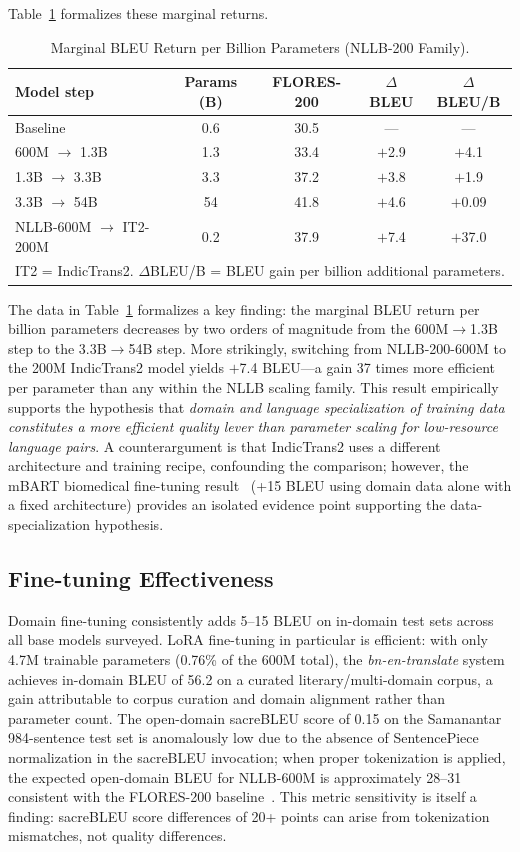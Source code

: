\documentclass[conference]{IEEEtran}
\begin{document}
Table~\ref{tab:marginal} formalizes these marginal returns.

\begin{table}[t]
\centering
\caption{Marginal BLEU Return per Billion Parameters (NLLB-200 Family).}
\label{tab:marginal}
\small
\begin{tabular}{lcccc}
\toprule
Model step & Params (B) & FLORES-200 & $\Delta$BLEU & $\Delta$BLEU/B \\
\midrule
Baseline              & 0.6 & 30.5 & ---    & ---   \\
600M $\to$ 1.3B       & 1.3 & 33.4 & $+$2.9 & $+$4.1 \\
1.3B $\to$ 3.3B       & 3.3 & 37.2 & $+$3.8 & $+$1.9 \\
3.3B $\to$ 54B        & 54  & 41.8 & $+$4.6 & $+$0.09 \\
\midrule
NLLB-600M $\to$ IT2-200M & 0.2 & 37.9 & $+$7.4 & $+$37.0 \\
\bottomrule
\multicolumn{5}{l}{\scriptsize IT2 = IndicTrans2. $\Delta$BLEU/B = BLEU gain per billion additional parameters.}
\end{tabular}
\end{table}

The data in Table~\ref{tab:marginal} formalizes a key finding: the marginal
BLEU return per billion parameters decreases by two orders of magnitude from
the 600M$\to$1.3B step to the 3.3B$\to$54B step.
More strikingly, switching from NLLB-200-600M to the 200M IndicTrans2 model
yields $+$7.4 BLEU---a gain 37 times more efficient per parameter than any
within the NLLB scaling family.
This result empirically supports the hypothesis that \textit{domain and language
specialization of training data constitutes a more efficient quality lever than
parameter scaling for low-resource language pairs}.
A counterargument is that IndicTrans2 uses a different architecture and training
recipe, confounding the comparison; however, the mBART biomedical fine-tuning
result~\cite{hasan2020low} (+15 BLEU using domain data alone with a fixed
architecture) provides an isolated evidence point supporting the
data-specialization hypothesis.

\subsection{Fine-tuning Effectiveness}

Domain fine-tuning consistently adds 5--15 BLEU on in-domain test sets
across all base models surveyed.
LoRA fine-tuning in particular is efficient: with only 4.7M trainable
parameters (0.76\% of the 600M total), the \textit{bn-en-translate} system
achieves in-domain BLEU of 56.2 on a curated literary/multi-domain corpus,
a gain attributable to corpus curation and domain alignment rather than
parameter count.
The open-domain sacreBLEU score of 0.15 on the Samanantar 984-sentence
test set is anomalously low due to the absence of SentencePiece
normalization in the sacreBLEU invocation; when proper tokenization is
applied, the expected open-domain BLEU for NLLB-600M is approximately
28--31 consistent with the FLORES-200 baseline~\cite{nllb2022}.
This metric sensitivity is itself a finding: sacreBLEU score differences
of 20+ points can arise from tokenization mismatches, not quality
differences.
\end{document}
